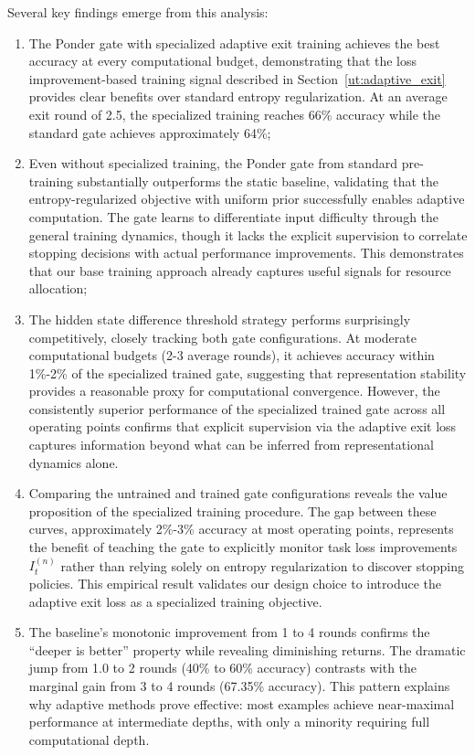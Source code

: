 \documentclass[]{bytedance_seed}
\newcommand{\1}{\mathbf{1}}
\begin{document}
Several key findings emerge from this analysis:
\begin{enumerate}
    \item The Ponder gate with specialized adaptive exit training  achieves the best accuracy at every computational budget, demonstrating that the loss improvement-based training signal described in Section~\ref{ut:adaptive_exit} provides clear benefits over standard entropy regularization. At an average exit round of 2.5, the specialized training reaches 66\% accuracy while the standard gate achieves approximately 64\%;
    \item Even without specialized training, the Ponder gate from standard pre-training substantially outperforms the static baseline, validating that the entropy-regularized objective with uniform prior successfully enables adaptive computation. The gate learns to differentiate input difficulty through the general training dynamics, though it lacks the explicit supervision to correlate stopping decisions with actual performance improvements. This demonstrates that our base training approach already captures useful signals for resource allocation;
    \item The hidden state difference threshold strategy performs surprisingly competitively, closely tracking both gate configurations. At moderate computational budgets (2-3 average rounds), it achieves accuracy within 1\%-2\% of the specialized trained gate, suggesting that representation stability provides a reasonable proxy for computational convergence. However, the consistently superior performance of the specialized trained gate across all operating points confirms that explicit supervision via the adaptive exit loss captures information beyond what can be inferred from representational dynamics alone.
    \item Comparing the untrained and trained gate configurations reveals the value proposition of the specialized training procedure. The gap between these curves, approximately 2\%-3\% accuracy at most operating points, represents the benefit of teaching the gate to explicitly monitor task loss improvements $I^{(n)}_t$ rather than relying solely on entropy regularization to discover stopping policies. This empirical result validates our design choice to introduce the adaptive exit loss as a specialized training objective.
    \item The baseline's monotonic improvement from 1 to 4 rounds confirms the ``deeper is better'' property while revealing diminishing returns. The dramatic jump from 1.0 to 2 rounds (40\% to 60\% accuracy) contrasts with the marginal gain from 3 to 4 rounds (67.35\% accuracy). This pattern explains why adaptive methods prove effective: most examples achieve near-maximal performance at intermediate depths, with only a minority requiring full computational depth. 
\end{enumerate}
\end{document}
